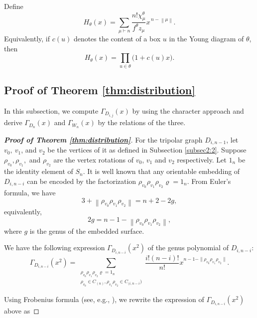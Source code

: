 \documentclass[12pt]{article}
\theoremstyle{definition}
\newcommand{\normcycles}[1]{\left\lVert #1\right\rVert}
\def\dsum{\displaystyle\sum}
\begin{document}
Define
\[
H_\theta(x)
=
\sum_{\mu\vdash n}
\frac{n!\chi_\mu^\theta}{f^\theta z_\mu}
x^{\,n-\normcycles{\mu}}.
\]
Equivalently, if $c(u)$ denotes the content of a box $u$ in the Young diagram
of $\theta$, then
\[
H_\theta(x)=\prod_{u\in\theta}\bigl(1+c(u)x\bigr).
\]

\subsection{Proof of Theorem \ref{thm:distribution}}
In this subsection, we compute $\Gamma_{D_{i,j}}(x)$ by using
the character approach and derive $\Gamma_{D_{n}}(x)$
and $\Gamma_{W_n}(x)$ by the relations of the three.

\begin{proof}[\bf{Proof of Theorem \ref{thm:distribution}}]

For the tripolar graph $D_{i,n-1}$, let $v_{0},~v_1$, and $v_2$ be the vertices of it as defined in Subsection \ref{subsec2:2}.
Suppose $\rho_{v_0},\rho_{v_1},$ and $\rho_{v_2}$ are the vertex rotations of $v_0$, $v_1$ and $v_2$ respectively. Let $1_n$ be the identity element of $S_n.$ It is well known that any orientable embedding of
$D_{i,n-i}$ can be encoded by the factorization
 $\rho_{v_0}\rho_{v_1}\rho_{v_2}\varrho=1_n.$
 From Euler's formula, we have
\[
3+\normcycles{\rho_{v_0}\rho_{v_1}\rho_{v_2}}
=n+2-2g,
\]
equivalently,
\[
2g
=n-1-\normcycles{\rho_{v_0}\rho_{v_1}\rho_{v_2}},
\]
where $g$ is the genus of the embedded surface.

We have the following expression $\Gamma_{D_{i,n-i}}(x^2)$ of the genus polynomial of $D_{i,n-i}$: $$\Gamma_{D_{i,n-i}}(x^2)=\dsum_{\substack{\rho_{v_0}\rho_{v_1}\rho_{v_2}\varrho=1_n\\\rho_{v_0}\in C_{(n)},\rho_{v_1}\rho_{v_2}\in C_{(i,n-i})}} \frac{i!(n-i)!}{n!} x^{n-1-\parallel\rho_{v_0}\rho_{v_1}\rho_{v_2}\parallel}.$$

Using Frobenius formula (see, e.g., \cite{Ja78}), we rewrite the expression of $\Gamma_{D_{i,n-i}}(x^2)$ above as


\end{proof}
\end{document}
